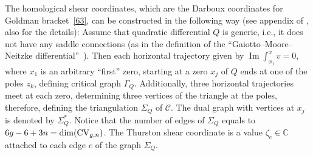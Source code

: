 \documentclass[pdftex]{sigma}
\numberwithin{equation}{section}
\theoremstyle{definition}
\newcommand{\CC}{\mathbb{C}}
\begin{document}
The homological shear coordinates, which are the Darboux coordinates for Goldman brack\-et~\eqref{63}, can be constructed in the following way (see appendix of \cite{bertola2021wkb}, also \cite{2021,chekhov} for the details):
Assume that quadratic differential $Q$ is generic, i.e., it does not have any saddle connections (as in the
definition of the ``Gaiotto--Moore--Neitzke differential''~\cite{giatto}).
Then each horizontal trajectory given by $\operatorname{Im} \int^x_{x_1}v=0$, where $x_1$ is an arbitrary ``first'' zero, starting at a zero $x_j$ of $Q$ ends at one of the poles $z_k$, defining critical graph $\Gamma_Q$. Additionally, three horizontal
trajectories meet at each zero, determining three vertices of the triangle at the poles, therefore,
defining the triangulation $\Sigma_Q$ of $\mathcal{C}$. The dual graph with vertices at $x_j$ is denoted by $\Sigma^*_Q$. Notice that the number of edges of $\Sigma_Q$ equals to $6g-6+3n=\dim ({\rm CV}_{g,n})$. The Thurston shear coordinate is a value $\zeta_e \in \CC$ attached to each edge $e$ of the graph $\Sigma_Q$.
\end{document}
